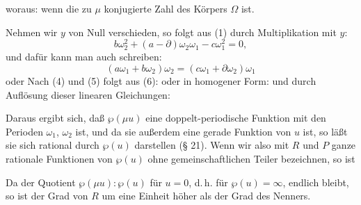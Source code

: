 
woraus:
wenn
die zu $\mu$ konjugierte Zahl des Körpers $\Omega$ ist.

Nehmen wir $y$ von Null verschieden, so folgt aus (1) durch Multiplikation mit $y$:
\[ b\omega_2^2 + (a-\partial)\omega_2\omega_1 - c\omega_1^2 = 0, \]
und dafür kann man auch schreiben:
\[ (a\omega_1 + b\omega_2)\omega_2 = (c\omega_1 + \partial\omega_2)\omega_1 \]
oder
Nach (4) und (5) folgt aus (6):
oder in homogener Form:
und durch Auflösung dieser linearen Gleichungen:

Daraus ergibt sich, daß $\wp(\mu u)$ eine doppelt-periodische Funktion mit den Perioden $\omega_1$, $\omega_2$ ist, und da sie außerdem eine gerade Funktion von $u$ ist, so läßt sie sich rational durch $\wp(u)$ darstellen (§ 21). Wenn wir also mit $R$ und $P$ ganze rationale Funktionen von $\wp(u)$ ohne gemeinschaftlichen Teiler bezeichnen, so ist

Da der Quotient $\wp(\mu u):\wp(u)$ für $u=0$, d.\,h. für $\wp(u)=\infty$, endlich bleibt, so ist der Grad von $R$ um eine Einheit höher als der Grad des Nenners.
